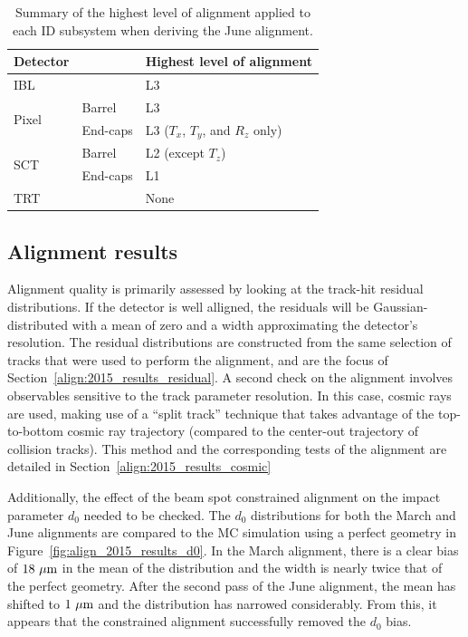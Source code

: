 \begin{table}[htbp]
  \centering
  \begin{tabular}{l l | l}
    Detector & & Highest level of alignment\\
    \hline\hline
    IBL && L3 \\
    \hline
    \multirow{2}{*}{Pixel} & Barrel & L3 \\
                           & End-caps & L3 ($T_x$, $T_y$, and $R_z$ only) \\
    \hline
    \multirow{2}{*}{SCT} & Barrel & L2 (except $T_z$) \\
                           & End-caps & L1 \\
    \hline
    TRT && None\\
    \hline
  \end{tabular} 
  \caption{Summary of the highest level of alignment applied to each ID subsystem when deriving the June alignment.}
  \label{tab:align_june_levels}
\end{table}

\subsection{Alignment results}
Alignment quality is primarily assessed by looking at the track-hit residual distributions.
If the detector is well alligned, the residuals will be Gaussian-distributed with a mean of zero and a width approximating the detector's resolution.
The residual distributions are constructed from the same selection of tracks that were used to perform the alignment, and are the focus of Section~\ref{align:2015_results_residual}.
A second check on the alignment involves observables sensitive to the track parameter resolution.
In this case, cosmic rays are used, making use of a ``split track'' technique that takes advantage of the top-to-bottom cosmic ray trajectory (compared to the center-out trajectory of collision tracks).
This method and the corresponding tests of the alignment are detailed in Section~\ref{align:2015_results_cosmic}

Additionally, the effect of the beam spot constrained alignment on the impact parameter $d_0$ needed to be checked.
The $d_0$ distributions for both the March and June alignments are compared to the MC simulation using a perfect geometry in Figure~\ref{fig:align_2015_results_d0}.
In the March alignment, there is a clear bias of $18~\mu\textrm{m}$ in the mean of the distribution and the width is nearly twice that of the perfect geometry.
After the second pass of the June alignment, the mean has shifted to $1~\mu\textrm{m}$ and the distribution has narrowed considerably.
From this, it appears that the constrained alignment successfully removed the $d_0$ bias.

